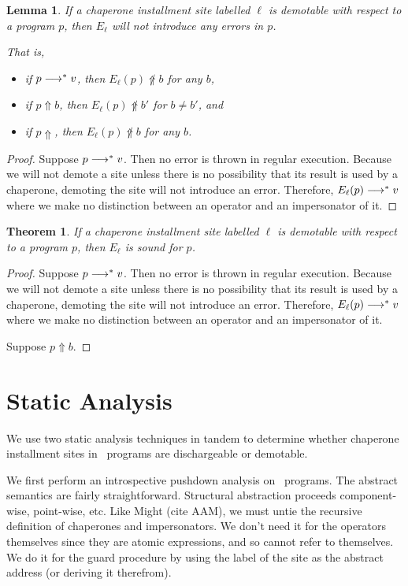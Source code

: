 \documentclass{sigplanconf}
\newtheorem{theorem}{Theorem}
\newtheorem{lemma}{Lemma}
\begin{document}
\begin{lemma}
If a chaperone installment site labelled $\ell$ is demotable with respect to a program $p$, then $E_\ell$ will not introduce any errors in $p$.

That is,
\begin{itemize}
\item if $p\longrightarrow^{*} v$, then $E_\ell(p)\not\Uparrow b$ for any $b$,
\item if $p\Uparrow b$, then $E_\ell(p)\not\Uparrow b'$ for $b\ne b'$, and
\item if $p\Uparrow$, then $E_\ell(p)\not\Uparrow b$ for any $b$.
\end{itemize}
\end{lemma}

\begin{proof}
Suppose $p\longrightarrow^{*} v$.
Then no error is thrown in regular execution.
Because we will not demote a site unless there is no possibility that its result is used by a chaperone, demoting the site will not introduce an error.
Therefore, $E_\ell(p)\longrightarrow^{*} v$ where we make no distinction between an operator and an impersonator of it.

\end{proof}

\begin{theorem}
If a chaperone installment site labelled $\ell$ is demotable with respect to a program $p$, then $E_\ell$ is sound for $p$.
\end{theorem}

\begin{proof}
Suppose $p\longrightarrow^{*} v$.
Then no error is thrown in regular execution.
Because we will not demote a site unless there is no possibility that its result is used by a chaperone, demoting the site will not introduce an error.
Therefore, $E_\ell(p)\longrightarrow^{*} v$ where we make no distinction between an operator and an impersonator of it.

Suppose $p\Uparrow b$.

\end{proof}

\section{Static Analysis}
We use two static analysis techniques in tandem to determine whether chaperone installment sites in \chapcalc\ programs are dischargeable or demotable.

We first perform an introspective pushdown analysis on \chapcalc\ programs.
The abstract semantics are fairly straightforward.
Structural abstraction proceeds component-wise, point-wise, etc.
Like Might (cite AAM), we must untie the recursive definition of chaperones and impersonators.
We don't need it for the operators themselves since they are atomic expressions, and so cannot refer to themselves.
We do it for the guard procedure by using the label of the site as the abstract address (or deriving it therefrom).
\end{document}
